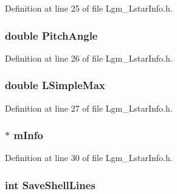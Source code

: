 Definition at line 25 of file Lgm\_\-LstarInfo.h.\hypertarget{struct_lgm___lstar_info_86da8321817d74036d3ff23e8643dc68}{
\subsubsection[{PitchAngle}]{\setlength{\rightskip}{0pt plus 5cm}double {\bf PitchAngle}}}
\label{struct_lgm___lstar_info_86da8321817d74036d3ff23e8643dc68}




Definition at line 26 of file Lgm\_\-LstarInfo.h.\hypertarget{struct_lgm___lstar_info_5d743063aa757414e17e949240d3c85b}{
\subsubsection[{LSimpleMax}]{\setlength{\rightskip}{0pt plus 5cm}double {\bf LSimpleMax}}}
\label{struct_lgm___lstar_info_5d743063aa757414e17e949240d3c85b}




Definition at line 27 of file Lgm\_\-LstarInfo.h.\hypertarget{struct_lgm___lstar_info_c8b439eddbb4183c79fe090c634587a5}{
\subsubsection[{mInfo}]{$\ast$ {\bf mInfo}}}
\label{struct_lgm___lstar_info_c8b439eddbb4183c79fe090c634587a5}




Definition at line 30 of file Lgm\_\-LstarInfo.h.\hypertarget{struct_lgm___lstar_info_5e915118a580b5fdd3fc46cb0a09d618}{
\subsubsection[{SaveShellLines}]{\setlength{\rightskip}{0pt plus 5cm}int {\bf SaveShellLines}}}
\label{struct_lgm___lstar_info_5e915118a580b5fdd3fc46cb0a09d618}




